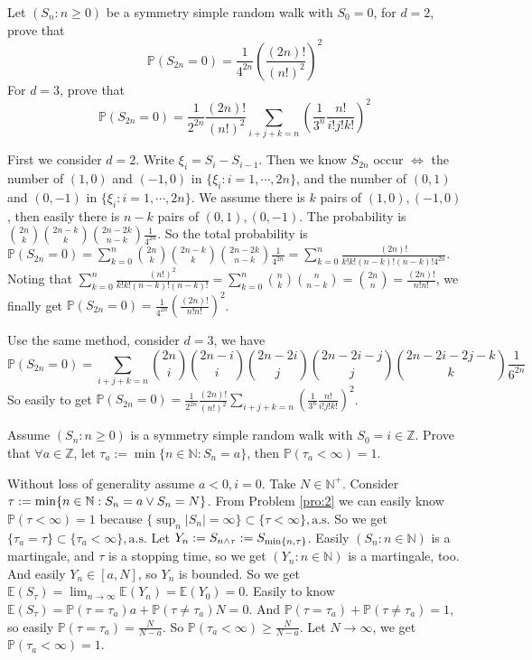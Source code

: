 \documentclass[../main]{subfiles}
\begin{document}
\begin{problem}\label{pro:3}
  Let \((S_n:n \geq 0)\) be a symmetry simple random walk with \(S_0=0\), for \(d=2\), prove that
  \[
    \mathbb{P}(S_{2n}=0)=\frac{1}{4^{2n}}\left(\frac{(2n)!}{(n!)^2}\right)^2
  \]
  For \(d=3\), prove that
  \[
    \mathbb{P}(S_{2n}=0)=\frac{1}{2^{2n}}\frac{(2n)!}{(n!)^2}\sum_{i + j + k = n} \left(\frac{1}{3^n}\frac{n!}{i!j!k!}\right)^2
  \]
\end{problem}
\begin{solution}
  First we consider \(d=2\). Write \(\xi_i=S_i-S_{i-1}\).
  Then we know \(S_{2n}\) occur \(\iff\) the number of \((1,0)\) and \((-1,0)\) in \(\{\xi_i:i=1,\cdots,2n\}\),
  and the number of \((0,1)\) and \((0,-1)\) in \(\{\xi_i:i=1,\cdots,2n\}\).
  We assume there is \(k\) pairs of \((1,0),(-1,0)\), then easily there is \(n-k\) pairs of \((0,1),(0,-1)\).
  The probability is \(\binom{2n}{k}\binom{2n-k}{k}\binom{2n-2k}{n-k}\frac{1}{4^{2n}}\).
  So the total probability is
  \(\mathbb{P}(S_{2n}=0)=\sum_{k=0}^{n}\binom{2n}{k}\binom{2n-k}{k}\binom{2n-2k}{n-k}\frac{1}{4^{2n}}=\sum_{k=0}^{n}\frac{(2n)!}{k!k!(n-k)!(n-k)!4^{2n}}\).
  Noting that \(\sum_{k=0}^{n}\frac{(n!)^2}{k!k!(n-k)!(n-k)!}=\sum_{k=0}^{n}\binom{n}{k}\binom{n}{n-k}=\binom{2n}{n}=\frac{(2n)!}{n!n!}\),
  we finally get \(\mathbb{P}(S_{2n}=0)=\frac{1}{4^{2n}}\left(\frac{(2n)!}{n!n!}\right)^2\).

  Use the same method, consider \(d=3\), we have
  \[
    \mathbb{P}(S_{2n}=0)=\sum_{i+j+k=n} \binom{2n}{i}\binom{2n-i}{i}\binom{2n-2i}{j}\binom{2n-2i-j}{j}\binom{2n-2i-2j-k}{k} \frac{1}{6^{2n}}
  \]
  So easily to get \(\mathbb{P}(S_{2n}=0)=\frac{1}{2^{2n}}\frac{(2n)!}{(n!)^2}\sum_{i + j + k = n} \left(\frac{1}{3^n}\frac{n!}{i!j!k!}\right)^2\).
\end{solution}

\begin{problem}\label{pro:4}
  Assume \((S_n:n \geq 0)\) is a symmetry simple random walk with \(S_0 = i \in \mathbb{Z}\).
  Prove that \(\forall a \in \mathbb{Z}\), let \(\tau_a:=\min\{n \in \mathbb{N}:S_n=a \}\), then \(\mathbb{P}(\tau_a < \infty) = 1 \).
\end{problem}
\begin{solution}
  Without loss of generality assume \(a<0,i=0\). Take \(N \in \mathbb{N}^+\). Consider \(\tau:=\min\{n \in \mathbb{N}:S_n=a \vee S_n=N\}\).
  From Problem \ref{pro:2} we can easily know \(\mathbb{P}(\tau < \infty)=1\) because \(\{\sup_n|S_n|=\infty\}\subset \{\tau<\infty\},\text{a.s.}\)
  So we get \(\{\tau_a = \tau\} \subset \{\tau_a<\infty\},\text{a.s.}\)
  Let \(Y_n:=S_{n \wedge \tau}:=S_{\min\{n,\tau\}}\).
  Easily \((S_n:n \in \mathbb{N})\) is a martingale, and \(\tau\) is a stopping time, so we get
  \((Y_n:n \in \mathbb{N})\) is a martingale, too.
  And easily \(Y_n \in [a,N]\), so \(Y_n\) is bounded.
  So we get \(\mathbb{E}(S_{\tau})=\lim_{n \to \infty}\mathbb{E}(Y_n)=\mathbb{E}(Y_0)=0\).
  Easily to know \(\mathbb{E}(S_{\tau})=\mathbb{P}(\tau=\tau_a)a+\mathbb{P}(\tau \neq \tau_a)N=0\).
  And \(\mathbb{P}(\tau=\tau_a)+\mathbb{P}(\tau \neq \tau_a)=1\),
  so easily \(\mathbb{P}(\tau=\tau_a)=\frac{N}{N-a}\).
  So \(\mathbb{P}(\tau_a<\infty)\geq \frac{N}{N-a}\).
  Let \(N \to \infty\), we get \(\mathbb{P}(\tau_a<\infty)=1\).
\end{solution}
\end{document}
